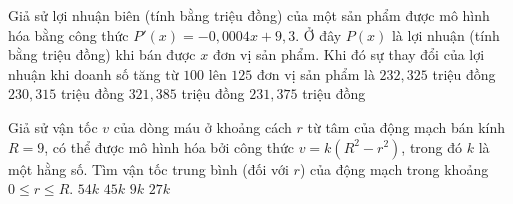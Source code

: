 \begin{ex}%
	Giả sử lợi nhuận biên (tính bằng triệu đồng)  của một sản phẩm được mô hình hóa bằng công thức $P'(x)=-0{,}0004x+9{,}3$. Ở đây $P(x)$ là lợi nhuận (tính bằng triệu đồng) khi bán được $x$ đơn vị sản phẩm. Khi đó sự thay đổi của lợi nhuận khi doanh số tăng từ $100$ lên $125$ đơn vị sản phẩm là
	 \choice
		{$232{,}325$ triệu  đồng}
		{$230{,}315$ triệu đồng} 
		{$321{,}385$  triệu đồng}
		 {\True $231{,}375$ triệu đồng}
\end{ex}

\begin{ex}%
	Giả sử vận tốc $v$ của dòng máu ở khoảng cách $r$ từ tâm của động mạch bán kính $R=9$, có thể được mô hình hóa bởi công thức $v=k\left(R^2-r^2\right)$, trong  đó $k$ là một hằng số. Tìm vận tốc trung bình (đối với $r$) của động mạch trong khoảng $0\le r\le R$.
	 \choice
		{\True $54k$} 
		 {$45k$}
		 {$9k$}
		{$27k$} 
\end{ex}

